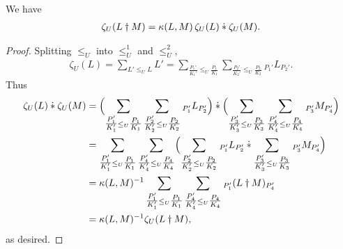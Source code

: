 \documentclass[12pt,a4paper]{amsart}
\begin{document}
We have
\begin{align*}
  \zeta_U(L \dagger M) = \kappa(L, M)\, \zeta_U(L) \mathbin{\dot{*}} \zeta_U(M)\text.
\end{align*}
\begin{proof}
  Splitting $\leq_U$ into $\leq_U^1$ and $\leq_U^2$,
  \begin{align*}
    \zeta_U(L) = \sum_{L' \leq_U L} L'
    = \sum_{\tfrac{P_1'}{K_1'} \leq_U \tfrac{P_1}{K_1}}
    \sum_{\tfrac{P_2'}{K_2'} \leq_U \tfrac{P_2}{K_2}}
    {}_{P_1'}L_{P_2'}.
  \end{align*}
  Thus
  \begin{align*}
    \zeta_U(L) \mathbin{\dot{*}} \zeta_U(M) &=
    \Bigl(\sum_{\tfrac{P_1'}{K_1'} \leq_U \tfrac{P_1}{K_1}}
    \sum_{\tfrac{P_2'}{K_2'} \leq_U \tfrac{P_2}{K_2}}
    {}_{P_1'}L_{P_2'}\Bigr)
    \mathbin{\dot{*}}
        \Bigl(\sum_{\tfrac{P_3'}{K_3'} \leq_U \tfrac{P_3}{K_3}}
    \sum_{\tfrac{P_4'}{K_4'} \leq_U \tfrac{P_4}{K_4}}
    {}_{P_3'}M_{P_4'}\Bigr) \\
&=
    \sum_{\tfrac{P_1'}{K_1'} \leq_U \tfrac{P_1}{K_1}}
    \sum_{\tfrac{P_4'}{K_4'} \leq_U \tfrac{P_4}{K_4}}
    \Bigl(\sum_{\tfrac{P_2'}{K_2'} \leq_U \tfrac{P_2}{K_2}}
    {}_{P_1'}L_{P_2'}
    \mathbin{\dot{*}}
        \sum_{\tfrac{P_3'}{K_3'} \leq_U \tfrac{P_3}{K_3}}
    {}_{P_3'}M_{P_4'}\Bigr) \\
&=
    \kappa(L, M)^{-1}
    \sum_{\tfrac{P_1'}{K_1'} \leq_U \tfrac{P_1}{K_1}}
    \sum_{\tfrac{P_4'}{K_4'} \leq_U \tfrac{P_4}{K_4}}
    {}_{P_1'}(L \dagger
    M)_{P_4'} \\
&=
    \kappa(L, M)^{-1}
    \zeta_U(L \dagger    M)\text,
  \end{align*}
  as desired.
\end{proof}
\end{document}
